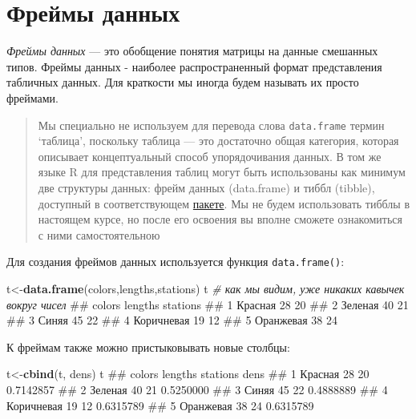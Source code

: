 \documentclass[]{book}
\newenvironment{Shaded}{\begin{snugshade}}{\end{snugshade}}
\newcommand{\KeywordTok}[1]{\textcolor[rgb]{0.13,0.29,0.53}{\textbf{#1}}}
\newcommand{\CommentTok}[1]{\textcolor[rgb]{0.56,0.35,0.01}{\textit{#1}}}
\newcommand{\NormalTok}[1]{#1}
\begin{document}
\section{Фреймы данных}\label{data_frames}

\emph{Фреймы данных} --- это обобщение понятия матрицы на данные
смешанных типов. Фреймы данных - наиболее распространенный формат
представления табличных данных. Для краткости мы иногда будем называть
их просто фреймами.

\begin{quote}
Мы специально не используем для перевода слова \texttt{data.frame}
термин `таблица', поскольку таблица --- это достаточно общая категория,
которая описывает концептуальный способ упорядочивания данных. В том же
языке R для представления таблиц могут быть использованы как минимум две
структуры данных: фрейм данных (data.frame) и тиббл (tibble), доступный
в соответствующем
\href{https://cran.r-project.org/web/packages/tibble/index.html}{пакете}.
Мы не будем использовать тибблы в настоящем курсе, но после его освоения
вы вполне сможете ознакомиться с ними самостоятельною
\end{quote}

Для создания фреймов данных используется функция \texttt{data.frame()}:

\begin{Shaded}
\begin{Highlighting}[]
\NormalTok{t<-}\KeywordTok{data.frame}\NormalTok{(colors,lengths,stations)}
\NormalTok{t  }\CommentTok{# как мы видим, уже никаких кавычек вокруг чисел}
\NormalTok{##       colors lengths stations}
\NormalTok{## 1    Красная      28       20}
\NormalTok{## 2    Зеленая      40       21}
\NormalTok{## 3      Синяя      45       22}
\NormalTok{## 4 Коричневая      19       12}
\NormalTok{## 5  Оранжевая      38       24}
\end{Highlighting}
\end{Shaded}

К фреймам также можно пристыковывать новые столбцы:

\begin{Shaded}
\begin{Highlighting}[]
\NormalTok{t<-}\KeywordTok{cbind}\NormalTok{(t, dens)}
\NormalTok{t}
\NormalTok{##       colors lengths stations      dens}
\NormalTok{## 1    Красная      28       20 0.7142857}
\NormalTok{## 2    Зеленая      40       21 0.5250000}
\NormalTok{## 3      Синяя      45       22 0.4888889}
\NormalTok{## 4 Коричневая      19       12 0.6315789}
\NormalTok{## 5  Оранжевая      38       24 0.6315789}
\end{Highlighting}
\end{Shaded}
\end{document}
